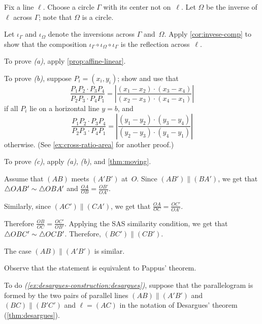\begin{multicols}{2}
Fix a line $\ell$.
Choose a circle $\Gamma$ with its center not on~$\ell$.
Let $\Omega$ be the inverse of $\ell$ across $\Gamma$;
note that $\Omega$ is a circle.

Let $\iota_\Gamma$ and $\iota_\Omega$ denote the inversions across $\Gamma$ and~$\Omega$.
Apply \ref{cor:invese-comp} to show that the composition 
$\iota_\Gamma\circ\iota_\Omega\circ\iota_\Gamma$
is the reflection across~$\ell$.

\setcounter{eqtn}{0}

To prove \textit{(a)}, apply \ref{prop:affine-linear}.

To prove \textit{(b)}, suppose $P_i=(x_i,y_i)$;
show and use that 
\[\frac{P_1P_2\cdot P_3P_4}{P_2P_3\cdot P_4P_1}
=\left|\frac{(x_1-x_2)\cdot(x_3-x_4)}{(x_2-x_3)\cdot (x_4-x_1)}\right|\]
if all $P_i$ lie on a horizontal line $y=b$, and
\[\frac{P_1P_2\cdot P_3P_4}{P_2P_3\cdot P_4P_1}
=\left|\frac{(y_1-y_2)\cdot(y_3-y_4)}{(y_2-y_3)\cdot (y_4-y_1)}\right|\]
otherwise. (See \ref{ex:cross-ratio-area} for another proof.)


To prove \textit{(c)}, apply \textit{(a)}, \textit{(b)}, and \ref{thm:moving}.

Assume that $(AB)$ meets $(A'B')$ at~$O$.
Since $(AB')\parallel (BA')$, we get that $\triangle OAB'\z\sim\triangle OBA'$
and
$\frac{OA}{OB}=\frac{OB'}{OA'}$.

Similarly, since $(AC')\parallel (CA')$, we get that
$\frac{OA}{OC}=\frac{OC'}{OA'}$.

Therefore
$\frac{OB}{OC}=\frac{OC'}{OB'}$.
Applying the SAS similarity condition, we get that
$\triangle OBC'\z\sim\triangle OCB'$.
Therefore, $(BC')\parallel (CB')$.

The case $(AB)\parallel(A'B')$ is similar.

 Observe that the statement is equivalent to Pappus' theorem.

To do \textit{(\ref{ex:desargues-construction:desargues})}, 
suppose that the parallelogram is formed by the two pairs of parallel lines $(AB)\parallel (A'B')$ and $(BC)\parallel(B'C')$ and $\ell=(AC)$ in the notation of Desargues' theorem (\ref{thm:desargues}).


\end{multicols}
